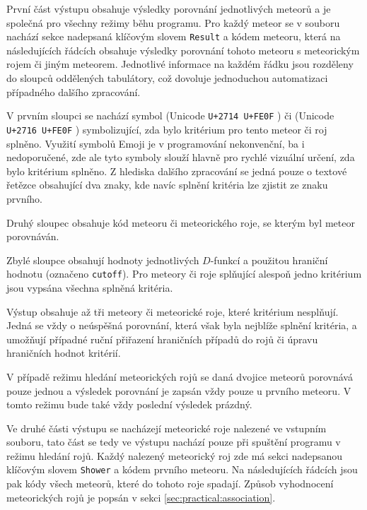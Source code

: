\medskip

První část výstupu obsahuje výsledky porovnání jednotlivých meteorů a je společná pro všechny režimy běhu programu. Pro každý meteor se v souboru nachází sekce nadepsaná klíčovým slovem \texttt{Result} a kódem meteoru, která na následujících řádcích obsahuje výsledky porovnání tohoto meteoru s meteorickým rojem či jiným meteorem. Jednotlivé informace na každém řádku jsou rozděleny do sloupců oddělených tabulátory, což dovoluje jednoduchou automatizaci případného dalšího zpracování.

V prvním sloupci se nachází symbol \eCheck\hspace{4pt}(Unicode \texttt{U+2714 U+FE0F} \cite{unicode}) či \eCross\hspace{4pt}(Unicode \texttt{U+2716 U+FE0F} \cite{unicode}) symbolizující, zda bylo kritérium pro tento meteor či roj splněno. Využití symbolů Emoji je v programování nekonvenční, ba i nedoporučené, zde ale tyto symboly slouží hlavně pro rychlé vizuální určení, zda bylo kritérium splněno. Z hlediska dalšího zpracování se jedná pouze o textové řetězce obsahující dva znaky, kde navíc splnění kritéria lze zjistit ze znaku prvního.

Druhý sloupec obsahuje kód meteoru či meteorického roje, se kterým byl meteor porovnáván.

Zbylé sloupce obsahují hodnoty jednotlivých $D$-funkcí a použitou hraniční hodnotu (označeno \texttt{cutoff}). Pro meteory či roje splňující alespoň jedno kritérium jsou vypsána všechna splněná kritéria.

\smallskip

Výstup obsahuje až tři meteory či meteorické roje, které kritérium nesplňují. Jedná se vždy o neúspěšná porovnání, která však byla nejblíže splnění kritéria, a umožňují případné ruční přiřazení hraničních případů do rojů či úpravu hraničních hodnot kritérií.

V případě režimu hledání meteorických rojů se daná dvojice meteorů porovnává pouze jednou a výsledek porovnání je zapsán vždy pouze u prvního meteoru. V tomto režimu bude také vždy poslední výsledek prázdný.

\medskip

Ve druhé části výstupu se nacházejí meteorické roje nalezené ve vstupním souboru, tato část se tedy ve výstupu nachází pouze při spuštění programu v režimu hledání rojů. Každý nalezený meteorický roj zde má sekci nadepsanou klíčovým slovem \texttt{Shower} a kódem prvního meteoru. Na následujících řádcích jsou pak kódy všech meteorů, které do tohoto roje spadají. Způsob vyhodnocení meteorických rojů je popsán v sekci \ref{sec:practical:association}.

